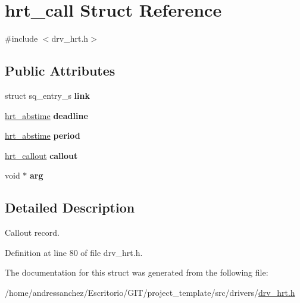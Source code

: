 \hypertarget{structhrt__call}{}\section{hrt\+\_\+call Struct Reference}
\label{structhrt__call}


{\ttfamily \#include $<$drv\+\_\+hrt.\+h$>$}

\subsection*{Public Attributes}
\begin{DoxyCompactItemize}
\item 
\mbox{\label{structhrt__call_a9e5f0257838253f2154864304a32ab02}} 
struct sq\+\_\+entry\+\_\+s {\bfseries link}
\item 
\mbox{\label{structhrt__call_a6ceccf9f1cf61c19960af17834c17a84}} 
\hyperlink{drv__hrt_8h_a9f8bbf0e883115e04a457a268533a87c}{hrt\+\_\+abstime} {\bfseries deadline}
\item 
\mbox{\label{structhrt__call_a92d4cb2db34d9f449df684dea2f1faa8}} 
\hyperlink{drv__hrt_8h_a9f8bbf0e883115e04a457a268533a87c}{hrt\+\_\+abstime} {\bfseries period}
\item 
\mbox{\label{structhrt__call_aad5880605fa741b171aa10456a959e3c}} 
\hyperlink{drv__hrt_8h_ac8f5a61245c186b72dbbd2466dcceea5}{hrt\+\_\+callout} {\bfseries callout}
\item 
\mbox{\label{structhrt__call_afe59f717509a796f96993d472de718d0}} 
void $\ast$ {\bfseries arg}
\end{DoxyCompactItemize}


\subsection{Detailed Description}
Callout record. 

Definition at line 80 of file drv\+\_\+hrt.\+h.



The documentation for this struct was generated from the following file\+:\begin{DoxyCompactItemize}
\item 
/home/andressanchez/\+Escritorio/\+G\+I\+T/project\+\_\+template/src/drivers/\hyperlink{drv__hrt_8h}{drv\+\_\+hrt.\+h}\end{DoxyCompactItemize}
